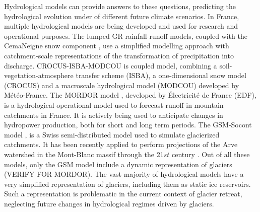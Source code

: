 Hydrological models can provide answers to these questions, predicting the hydrological evolution under of different future climate scenarios. In France, multiple hydrological models are being developed and used for research and operational purposes. The lumped GR rainfall-runoff models, coupled with the CemaNeigne snow component \citep{coron_suite_2017}, use a simplified modelling approach with catchment-scale representations of the transformation of precipitation into discharge. CROCUS-ISBA-MODCOU \citep{etchevers_simulation_2001} is coupled model, combining a soil-vegetation-atmosphere transfer scheme (ISBA), a one-dimensional snow model (CROCUS) and a macroscale hydrological model (MODCOU) developed by Météo-France. The MORDOR model \citep{paquet_evolution_2004}, developed by Électricité de France (EDF), is a hydrological operational model used to forecast runoff in mountain catchments in France. It is actively being used to anticipate changes in hydropower production, both for short and long term periods. The GSM-Socont model \citep{schaefli_conceptual_2005}, is a Swiss semi-distributed model used to simulate glacierized catchments. It has been recently applied to perform projections of the Arve watershed in the Mont-Blanc massif through the 21${st}$ century \citep{laurent_impact_2020}. Out of all these models, only the GSM model include a dynamic representation of glaciers (VERIFY FOR MORDOR). The vast majority of hydrological models have a very simplified representation of glaciers, including them as static ice reservoirs. Such a representation is problematic in the current context of glacier retreat, neglecting future changes in hydrological regimes driven by glaciers. 

